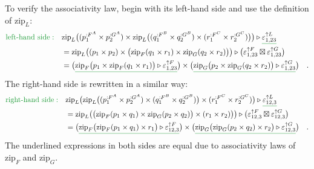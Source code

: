 To verify the associativity law, begin with its left-hand side and
use the definition of $\text{zip}_{L}$:
\begin{align*}
{\color{greenunder}\text{left-hand side}:}\quad & \text{zip}_{L}\big((p_{1}^{:F^{A}}\times p_{2}^{:G^{A}})\times\text{zip}_{L}\big((q_{1}^{:F^{B}}\times q_{2}^{:G^{B}})\times(r_{1}^{:F^{C}}\times r_{2}^{:G^{C}})\big)\big)\triangleright\gunderline{\varepsilon_{1,23}^{\uparrow L}}\\
 & =\text{zip}_{L}\big((p_{1}\times p_{2})\times\big(\text{zip}_{F}(q_{1}\times r_{1})\times\text{zip}_{G}(q_{2}\times r_{2})\big)\big)\triangleright\big(\varepsilon_{1,23}^{\uparrow F}\boxtimes\varepsilon_{1,23}^{\uparrow G}\big)\\
 & =\big(\gunderline{\text{zip}_{F}\big(p_{1}\times\text{zip}_{F}(q_{1}\times r_{1})\big)\triangleright\varepsilon_{1,23}^{\uparrow F}}\big)\times\big(\gunderline{\text{zip}_{G}\big(p_{2}\times\text{zip}_{G}(q_{2}\times r_{2})\big)\triangleright\varepsilon_{1,23}^{\uparrow G}}\big)\quad.
\end{align*}
The right-hand side is rewritten in a similar way:
\begin{align*}
{\color{greenunder}\text{right-hand side}:}\quad & \text{zip}_{L}\big(\text{zip}_{L}\big((p_{1}^{:F^{A}}\times p_{2}^{:G^{A}})\times(q_{1}^{:F^{B}}\times q_{2}^{:G^{B}})\big)\times(r_{1}^{:F^{C}}\times r_{2}^{:G^{C}})\big)\triangleright\gunderline{\varepsilon_{12,3}^{\uparrow L}}\\
 & =\text{zip}_{L}\big(\big(\text{zip}_{F}(p_{1}\times q_{1})\times\text{zip}_{G}(p_{2}\times q_{2})\big)\times(r_{1}\times r_{2})\big)\big)\triangleright\big(\varepsilon_{12,3}^{\uparrow F}\boxtimes\varepsilon_{12,3}^{\uparrow G}\big)\\
 & =\big(\gunderline{\text{zip}_{F}\big(\text{zip}_{F}(p_{1}\times q_{1})\times r_{1}\big)\triangleright\varepsilon_{12,3}^{\uparrow F}}\big)\times\big(\gunderline{\text{zip}_{G}\big(\text{zip}_{G}(p_{2}\times q_{2})\times r_{2}\big)\triangleright\varepsilon_{12,3}^{\uparrow G}}\big)\quad.
\end{align*}
The underlined expressions in both sides are equal due to associativity
laws of $\text{zip}_{F}$ and $\text{zip}_{G}$.

